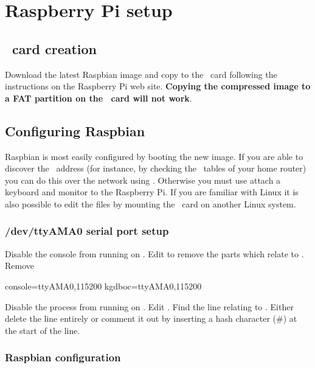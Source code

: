 \chapter{Raspberry Pi setup}

\section[SD card creation]{\sd\ card creation}

Download the latest Raspbian image and copy to the \sd\ card following
the instructions on the Raspberry Pi web site. \textbf{Copying
  the compressed image to a FAT partition on the \sd\ card will not work}.

\section{Configuring Raspbian}


Raspbian is most easily configured by booting the new image. If you
are able to discover the \ip\ address (for instance, by checking the
\dhcp\ tables of your home router) you can do this over the network
using \ssh. Otherwise you must use attach a keyboard and monitor to the
Raspberry Pi. If you are familiar with Linux it is also possible to
edit the files by mounting the \sd\ card on another Linux system.

\subsection{/dev/ttyAMA0 serial port setup}

Disable the console from running on . Edit
 to remove the parts which relate to
. Remove
\begin{Cmd}
console=ttyAMA0,115200 kgdboc=ttyAMA0,115200
\end{Cmd}


Disable the  process from running on
. Edit . Find the line
relating to . Either delete the line entirely or
comment it out by inserting a hash character (\#) at the start of the
line.

\subsection{Raspbian configuration}

